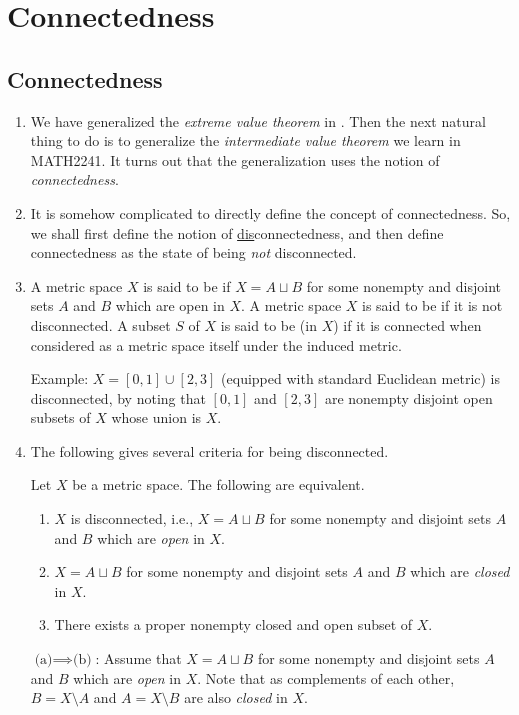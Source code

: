 \section{Connectedness}
\label{sect:connectedness}
\subsection{Connectedness}
\label{subsect:connectedness}
\begin{enumerate}
\item We have generalized the \emph{extreme value theorem} in
. Then the next natural thing to do is to generalize the
\emph{intermediate value theorem} we learn in MATH2241. It turns out that the
generalization uses the notion of \emph{connectedness}.

\item It is somehow complicated to directly define the concept of
connectedness. So, we shall first define the notion of
\underline{dis}connectedness, and then define connectedness as the state of
being \emph{not} disconnected.

\item A metric space \(X\) is said to be  if \(X=A\sqcup B\)
for some nonempty and disjoint sets \(A\) and \(B\) which are open in \(X\).  A
metric space \(X\) is said to be  if it is not disconnected. A
subset \(S\) of \(X\) is said to be  (in \(X\)) if it is
connected when considered as a metric space itself under the induced metric.

Example: \(X=[0,1]\cup [2,3]\) (equipped with standard Euclidean metric) is
disconnected, by noting that \([0,1]\) and \([2,3]\) are nonempty disjoint open
subsets of \(X\) whose union is \(X\).

\item The following gives several criteria for being disconnected.

\begin{proposition}
\label{prp:discon-crit}
Let \(X\) be a metric space. The following are equivalent.
\begin{enumerate}
\item \(X\) is disconnected, i.e., \(X=A\sqcup B\) for some nonempty and
disjoint sets \(A\) and \(B\) which are \emph{open} in \(X\).
\item \(X=A\sqcup B\) for some nonempty and
disjoint sets \(A\) and \(B\) which are \emph{closed} in \(X\).
\item There exists a proper nonempty closed and open subset of \(X\).
\end{enumerate}
\end{proposition}
\begin{pf}
\underline{\(\text{(a)}\implies \text{(b)}\)}: Assume that \(X=A\sqcup B\) for some nonempty and
disjoint sets \(A\) and \(B\) which are \emph{open} in \(X\). Note that as
complements of each other, \(B=X\setminus A\) and \(A=X\setminus B\) are also
\emph{closed} in \(X\).


\end{pf}
\end{enumerate}
